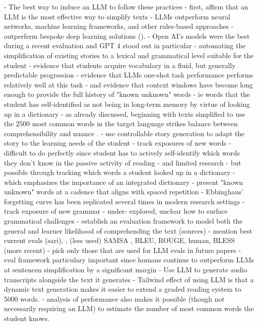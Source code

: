 \documentclass[
	letterpaper, %
]{jdf}
\begin{document}
- The best way to induce an LLM to follow these practices
  - first, affirm that an LLM is the most effective way to simplify texts
    - LLMs outperform neural networks, machine learning frameworks, and other rules-based approaches
      - outperferm bespoke deep learning solutions (\cite{feng2023sentence}).
    - Open AI's models were the best during a recent evaluation \cite{kew2023bless} and GPT 4 stood out in particular \cite{wu2024indepth}
  - automating the simplification of existing stories to a lexical and grammatical level suitable for the student
    - evidence that students acquire vocabulary in a fluid, but generally predictable progression
    - evidence that LLMs one-shot task performance performs relatively well at this task
      - and evidence that context windows have become long enough to provide the full history of "known unknown" words
        - ie words that the student has self-identified as not being in long-term memory by virtue of looking up in a dictionary
    - as already discussed, beginning with texts simplified to use the 2500 most common words in the target language strikes balance between comprehensibility and nuance \cite{nation1992vocabulary}.
  - use controllable story generation to adapt the story to the learning needs of the student 
    - track exposures of new words 
      - difficult to do perfectly since student has to actively self-identify which words they don't know in the passive activity of reading
        - and limited research
        - but possible through tracking which words a student looked up in a dictionary
          - which emphasizes the importance of an integrated dictionary
    - present "known unknown" words at a cadence that aligns with spaced repetition
      - Ebbinghaus' forgetting curve has been replicated several times in modern research settings \cite{Murre2015ReplicationAA}
    - track exposure of new grammar
      - under- explored, unclear how to surface grammatical challenges
  - establish an evaluation framework to model both the general and learner likelihood of comprehending the text (sources)
    - mention best current evals (sari), \cite{xu-etal-2016-optimizing}, (less used) SAMSA \cite{sulem-etal-2018-semantic}, BLEU, ROUGE, human, BLESS (more recent) \cite{kew2023bless}
      - pick only those that are used for LLM evals in future papers
      - eval framework particulary important since humans continue to outperform LLMs at sentencen simplification by a significant margin\cite{kew2023bless}
  - Use LLM to generate audio transcripts alongside the text it generates \cite{Chang2015ImprovingRR}
  - Tailwind effect of using LLM is that a dynamic text generation makes it easier to extend a graded reading system to 5000 words.
    - analysis of performance also makes it possible (though not necessarily requiring an LLM) to estimate the number of most common words the student knows.


\printbibliography{}
\end{document}
